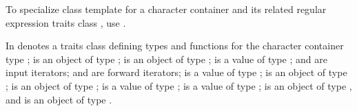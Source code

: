 \pnum
To specialize class template  for a character
container  and its related regular
expression traits class , use .

\pnum
{}%
%
%
%
In   denotes a traits class
defining types and functions for the character container
type ;  is an object of
type ;  is an object of type ;  is a value of type ; 
and  are input iterators;
 and  are forward iterators;
 is a value of type ;
 is an object of type ;
 is an object of type ;
 is a value of  type ;
 is a value of type ;
 is an object of type ,
and  is an object of type .

